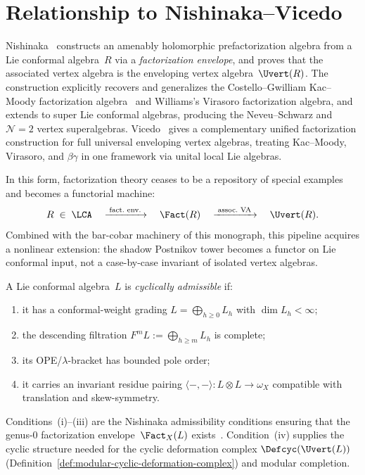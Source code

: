\section{Relationship to Nishinaka--Vicedo}
\label{sec:concordance-nishinaka-vicedo}

Nishinaka~\cite{Nish26} constructs an amenably holomorphic
prefactorization algebra from a Lie conformal algebra~$R$ via a
\emph{factorization envelope}, and proves that the associated
vertex algebra is the enveloping vertex algebra~$\Uvert(R)$.
The construction explicitly recovers and generalizes the
Costello--Gwilliam Kac--Moody factorization algebra~\cite{CG17}
and Williams's Virasoro factorization algebra, and extends to
super Lie conformal algebras, producing the Neveu--Schwarz and
$\mathcal{N}=2$ vertex superalgebras.  Vicedo~\cite{Vic25}
gives a complementary unified factorization construction for
full universal enveloping vertex algebras, treating Kac--Moody,
Virasoro, and $\beta\gamma$ in one framework via unital
local Lie algebras.

In this form, factorization theory ceases to be a repository of
special examples and becomes a functorial machine:
\begin{equation}\label{eq:factorization-envelope-pipeline}
R \;\in\; \LCA
\quad\xrightarrow{\;\text{fact.\ env.}\;}\quad
\Fact(R)
\quad\xrightarrow{\;\text{assoc.\ VA}\;}\quad
\Uvert(R).
\end{equation}
Combined with the bar-cobar machinery of this monograph,
this pipeline acquires a nonlinear extension: the shadow
Postnikov tower becomes a functor on Lie conformal input,
not a case-by-case invariant of isolated vertex algebras.

\begin{definition}
\label{def:cyclically-admissible}
\ClaimStatusProvedHere
{}
A Lie conformal algebra~$L$ is \emph{cyclically admissible} if:
\begin{enumerate}[label=\textup{(\roman*)}]
\item it has a conformal-weight grading
  $L = \bigoplus_{h \geq 0} L_h$ with $\dim L_h < \infty$;
\item the descending filtration
  $F^m L := \bigoplus_{h \geq m} L_h$ is complete;
\item its OPE/$\lambda$-bracket has bounded pole order;
\item it carries an invariant residue pairing
  $\langle{-},{-}\rangle \colon L \otimes L \to \omega_X$
  compatible with translation and skew-symmetry.
\end{enumerate}
Conditions~(i)--(iii) are the Nishinaka admissibility
conditions ensuring that the genus-$0$ factorization
envelope~$\Fact_X(L)$ exists~\cite{Nish26}.
Condition~(iv) supplies the cyclic structure needed for the
cyclic deformation complex
$\Defcyc(\Uvert(L))$
(Definition~\ref{def:modular-cyclic-deformation-complex})
and modular completion.
\end{definition}

